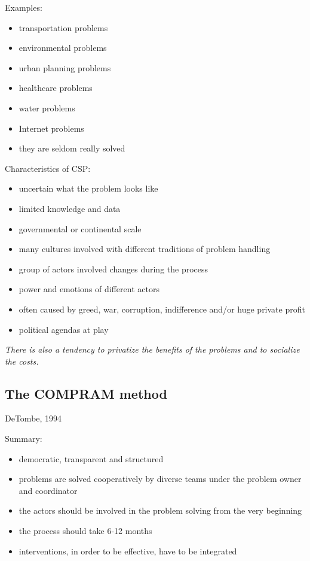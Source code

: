 Examples:

\begin{itemize}
	\item transportation problems
	\item environmental problems
	\item urban planning problems
	\item healthcare problems
	\item water problems
	\item Internet problems
	\item they are seldom really solved
\end{itemize}

Characteristics of CSP:

\begin{itemize}
	\item uncertain what the problem looks like
	\item limited knowledge and data
	\item governmental or continental scale
	\item many cultures involved with different traditions of problem
	handling
	\item group of actors involved changes during the process
	\item power and emotions of different actors
	\item often caused by greed, war, corruption, indifference and/or huge
	private profit
	\item political agendas at play
\end{itemize}

\textit{There is also a tendency to privatize the
benefits of the problems and to socialize the costs.}

\subsection{The COMPRAM method}
DeTombe, 1994

Summary:

\begin{itemize}
	\item democratic, transparent and structured
	\item problems are solved cooperatively by diverse teams under the
	problem owner and coordinator
	\item the actors should be involved in the problem solving from the
	very beginning
	\item the process should take 6-12 months
	\item interventions, in order to be effective, have to be integrated
\end{itemize}

